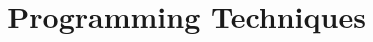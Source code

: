 

\usepackage{gnuplot-lua-tikz}

\usepackage{enumitem}

\title{Programming Techniques
\ \\
 }
\date{}
\publishers{Andreas Urech\\D-ITET\\ETH
}

\maketitle
\thispagestyle{empty}
\newpage
\thispagestyle{empty}
\tableofcontents
\newpage
